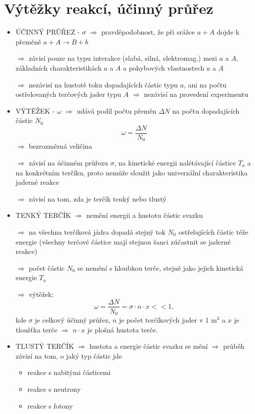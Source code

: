 \documentclass[../../main.tex]{subfiles}
\begin{document}
\section{Výtěžky reakcí, účinný průřez}
\begin{itemize}
	\item ÚČINNÝ PRŮŘEZ - $\sigma$ $\Rightarrow$ pravděpodobnost, že při srážce $a + A$ dojde k přeměně $a+A \rightarrow B+b$
	
	$\Rightarrow$ závisí pouze na typu interakce (slabá, silná, elektromag.) mezi $a$ a $A$, základních charakteristikách $a$ a $A$ a pohybových vlastnostech $a$ a $A$
	
	$\Rightarrow$ nezávisí na hustotě toku dopadajících částic typu $a$, ani na počtu ostřelovaných terčových jader typu $A$ $\Rightarrow$ nezávisí na provedení experimentu
	
	\item VÝTĚŽEK - $\omega$ $\Rightarrow$ udává podíl počtu přeměn $\Delta N$ na počtu dopadajících částic $N_0$
	\begin{equation}
	\omega = \dfrac{\Delta N }{N_0}
	\end{equation}
	$\Rightarrow$ bezrozměrná veličina
	
	$\Rightarrow$ závisí na účinném průřezu $\sigma$, na kinetické energii nalétávající částice $T_a$ a na konkrétním terčíku, proto nemůže sloužit jako univerzální charakteristika jaderné reakce
	
	$\Rightarrow$ závisí na tom, zda je terčík tenký nebo tlustý
	
	\item TENKÝ TERČÍK $\Rightarrow$ nemění energii a hustotu částic svazku
	
	$\Rightarrow$ na všechna terčíková jádra dopadá stejný tok $N_0$ ostřelujících částic téže energie (všechny terčové částice mají stejnou šanci zúčastnit se jaderné reakce)
	
	$\Rightarrow$ počet částic $N_0$ se nemění s hloubkou terče, stejně jako jejich kinetická energie $T_a$
	
	$\Rightarrow$ výtěžek:
	\begin{equation} 
	\omega = \dfrac{\Delta N }{N_0} = \sigma \cdotp  n \cdotp x << 1,
	\end{equation}
	kde $\sigma$ je celkový účinný průřez, $n$ je počet terčíkových jader v 1 $\mathrm{m^3}$ a $x$ je tloušťka terče $\Rightarrow$ $n \cdotp x$ je plošná hustota terče.
	
	\item TLUSTÝ TERČÍK $\Rightarrow$ hustota a energie částic svazku se mění $\Rightarrow$ průběh závisí na tom, o jaký typ částic jde 
	\begin{itemize}
		\item reakce s nabitými částicemi
		\item reakce s neutrony 
		\item reakce s fotony
	\end{itemize}
\end{itemize}
\end{document}
